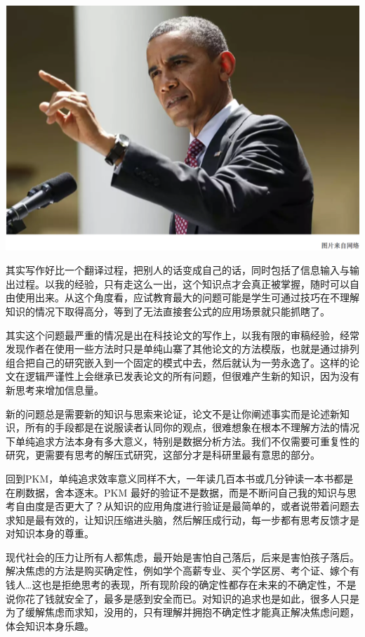\documentclass[]{book}
\begin{document}
\includegraphics[width=8.33in]{images/gtd3}

其实写作好比一个翻译过程，把别人的话变成自己的话，同时包括了信息输入与输出过程。以我的经验，只有走这么一出，这个知识点才会真正被掌握，随时可以自由使用出来。从这个角度看，应试教育最大的问题可能是学生可通过技巧在不理解知识的情况下取得高分，等到了无法直接套公式的应用场景就只能抓瞎了。

其实这个问题最严重的情况是出在科技论文的写作上，以我有限的审稿经验，经常发现作者在使用一些方法时只是单纯山寨了其他论文的方法模版，也就是通过排列组合把自己的研究嵌入到一个固定的模式中去，然后就认为一劳永逸了。这样的论文在逻辑严谨性上会继承已发表论文的所有问题，但很难产生新的知识，因为没有新思考来增加信息量。

新的问题总是需要新的知识与思索来论证，论文不是让你阐述事实而是论述新知识，所有的手段都是在说服读者认同你的观点，很难想象在根本不理解方法的情况下单纯追求方法本身有多大意义，特别是数据分析方法。我们不仅需要可重复性的研究，更需要有思考的解压式研究，这部分才是科研里最有意思的部分。

回到PKM，单纯追求效率意义同样不大，一年读几百本书或几分钟读一本书都是在刷数据，舍本逐末。PKM 最好的验证不是数据，而是不断问自己我的知识与思考自由度是否更大了？从知识的应用角度进行验证是最简单的，或者说带着问题去求知是最有效的，让知识压缩进头脑，然后解压成行动，每一步都有思考反馈才是对知识本身的尊重。

现代社会的压力让所有人都焦虑，最开始是害怕自己落后，后来是害怕孩子落后。解决焦虑的方法是购买确定性，例如学个高薪专业、买个学区房、考个证、嫁个有钱人\ldots{}这也是拒绝思考的表现，所有现阶段的确定性都存在未来的不确定性，不是说你花了钱就安全了，最多是感到安全而已。对知识的追求也是如此，很多人只是为了缓解焦虑而求知，没用的，只有理解并拥抱不确定性才能真正解决焦虑问题，体会知识本身乐趣。
\end{document}
